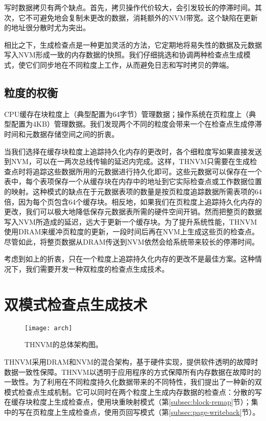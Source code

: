写时数据拷贝有两个缺点。首先，拷贝操作代价较大，会引发较长的停滞时间。其次，它不可避免地会复制未更改的数据，消耗额外的NVM带宽。这个缺陷在更新的地址很分散时尤为突出。

相比之下，生成检查点是一种更加灵活的方法，它定期地将易失性的数据及元数据写入NVM形成一致的内存数据的快照。我们仔细挑选和协调两种检查点生成模式，使它们同步地在不同粒度上工作，从而避免日志和写时拷贝的弊端。

\subsection{粒度的权衡}

CPU缓存在块粒度上（典型配置为64字节）管理数据；操作系统在页粒度上（典型配置为4KB）管理数据。我们发现两个不同的粒度会带来一个在检查点生成停滞时间和元数据存储空间之间的折衷。

当我们选择在缓存块粒度上追踪持久化内存的更改时，各个细粒度写如果直接发送到NVM，可以在一两次总线传输的延迟内完成。这样，THNVM只需要在生成检查点时将追踪这些数据所用的元数据进行持久化即可。这些元数据可以保存在一个表中，每个表项保存一个从缓存块在内存中的地址到它实际检查点或工作数据位置的映射。这种模式的缺点在于元数据表项的数量是按页粒度追踪数据所需表项的64倍，因为每个页包含64个缓存块。相反地，如果我们在页粒度上追踪持久化内存的更改，我们可以极大地降低保存元数据表所需的硬件空间开销。然而把整页的数据写入NVM所造成的延迟，远大于更新一个缓存块。为了提升系统性能，THNVM使用DRAM来缓冲页粒度的更新，一段时间后再在NVM上生成这些页的检查点。尽管如此，将整页数据从DRAM传送到NVM依然会给系统带来较长的停滞时间。

考虑到如上的折衷，只在一个粒度上追踪持久化内存的更改不是最佳方案。这种情况下，我们需要开发一种双粒度的检查点生成技术。

\section{双模式检查点生成技术}

\begin{figure}[!h]
\centering
\texttt{[image: arch]}
\caption{THNVM的总体架构图。}
\label{fig-arch}
\end{figure}

THNVM采用DRAM和NVM的混合架构，基于硬件实现，提供软件透明的故障时数据一致性保障。THNVM以透明于应用程序的方式保障所有内存数据在故障时的一致性。为了利用在不同粒度持久化数据带来的不同特性，我们提出了一种新的双模式检查点生成机制。它可以同时在两个粒度上生成内存数据的检查点：分散的写在缓存块粒度上生成检查点，使用块重映射模式（第\ref{subsec:block-remap}节）；集中的写在页粒度上生成检查点，使用页回写模式（第\ref{subsec:page-writeback}节）。

